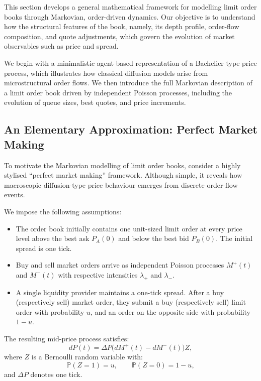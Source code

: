 This section develops a general mathematical framework for modelling limit order books
through Markovian, order-driven dynamics. Our objective is to understand how the
structural features of the book, namely, its depth profile, order-flow composition, and quote
adjustments, which govern the evolution of market observables such as price and spread.  

We begin with a minimalistic agent-based representation of a Bachelier-type price process,
which illustrates how classical diffusion models arise from microstructural order flows.
We then introduce the full Markovian description of a limit order book driven by
independent Poisson processes, including the evolution of queue sizes, best quotes, and
price increments.

\subsection{An Elementary Approximation: Perfect Market Making}

To motivate the Markovian modelling of limit order books, consider a highly stylised
``perfect market making'' framework. Although simple, it reveals how macroscopic
diffusion-type price behaviour emerges from discrete order-flow events.

We impose the following assumptions:
\begin{itemize}
    \item The order book initially contains one unit-sized limit order at every price level above
    the best ask \(P_A(0)\) and below the best bid \(P_B(0)\). The initial spread is one tick.
    \item Buy and sell market orders arrive as independent Poisson processes
    \( M^+(t) \) and \( M^-(t) \)
    with respective intensities \( \lambda_+ \) and \( \lambda_- \).
    \item A single liquidity provider maintains a one-tick spread.  
    After a buy (respectively sell) market order, they submit a buy (respectively sell) limit order
    with probability \(u\), and an order on the opposite side with probability \(1-u\).
\end{itemize}

The resulting mid-price process satisfies:
\begin{equation}
dP(t)
= \Delta P \bigl( dM^+(t) - dM^-(t) \bigr) Z,
\end{equation}
where \(Z\) is a Bernoulli random variable with: 
\[
\mathbb{P}(Z=1)=u, \qquad \mathbb{P}(Z=0)=1-u,
\]
and \( \Delta P \) denotes one tick.

